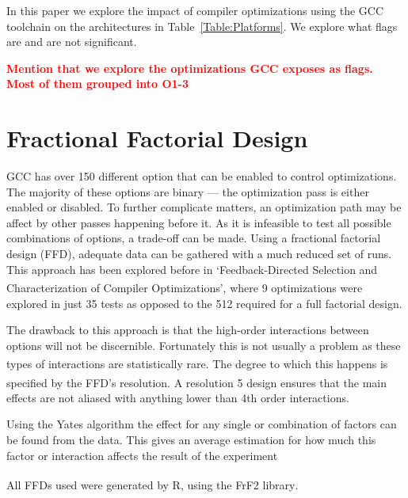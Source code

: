 \documentclass[twocolumn]{article}
\newcommand{\todo}[1]{\textbf{\textcolor{red}{#1}}}
\let\oldcite\cite
\renewcommand{\cite}[1]{\textsuperscript{\oldcite{#1}}}
\begin{document}
In this paper we explore the impact of compiler optimizations using the GCC toolchain on the architectures in Table~\ref{Table:Platforms}. We explore what flags are and are not significant.

\todo{Mention that we explore the optimizations GCC exposes as flags. Most of them grouped into O1-3}


\section*{Fractional Factorial Design}

GCC has over 150 different option that can be enabled to control optimizations. The majority of these options are binary --- the optimization pass is either enabled or disabled. To further complicate matters, an optimization path may be affect by other passes happening before it. As it is infeasible to test all possible combinations of options, a trade-off can be made. Using a fractional factorial design (FFD), adequate data can be gathered with a much reduced set of runs. This approach has been explored before in `Feedback-Directed Selection and Characterization of Compiler Optimizations'\cite{IntelPaper}, where 9 optimizations were explored in just 35 tests as opposed to the 512 required for a full factorial design.

The drawback to this approach is that the high-order interactions between options will not be discernible. Fortunately this is not usually a problem as these types of interactions are statistically rare\todo{\cite{REF sparsity of effects?}}. The degree to which this happens is specified by the FFD's resolution\cite{BoxHunter}. A resolution 5 design ensures that the main effects are not aliased with anything lower than 4th order interactions.

Using the Yates algorithm the effect for any single or combination of factors can be found from the data. This gives an average estimation for how much this factor or interaction affects the result of the experiment




All FFDs used were generated by R, using the FrF2 library\cite{FrF2}.
\end{document}

